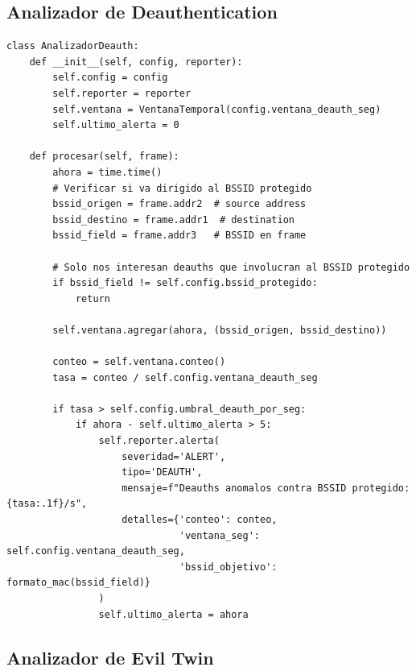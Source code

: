 \documentclass[11pt,a4paper]{article}
\begin{document}
\subsection{Analizador de Deauthentication}

\begin{lstlisting}
class AnalizadorDeauth:
    def __init__(self, config, reporter):
        self.config = config
        self.reporter = reporter
        self.ventana = VentanaTemporal(config.ventana_deauth_seg)
        self.ultimo_alerta = 0

    def procesar(self, frame):
        ahora = time.time()
        # Verificar si va dirigido al BSSID protegido
        bssid_origen = frame.addr2  # source address
        bssid_destino = frame.addr1  # destination
        bssid_field = frame.addr3   # BSSID en frame

        # Solo nos interesan deauths que involucran al BSSID protegido
        if bssid_field != self.config.bssid_protegido:
            return

        self.ventana.agregar(ahora, (bssid_origen, bssid_destino))

        conteo = self.ventana.conteo()
        tasa = conteo / self.config.ventana_deauth_seg

        if tasa > self.config.umbral_deauth_por_seg:
            if ahora - self.ultimo_alerta > 5:
                self.reporter.alerta(
                    severidad='ALERT',
                    tipo='DEAUTH',
                    mensaje=f"Deauths anomalos contra BSSID protegido: {tasa:.1f}/s",
                    detalles={'conteo': conteo,
                              'ventana_seg': self.config.ventana_deauth_seg,
                              'bssid_objetivo': formato_mac(bssid_field)}
                )
                self.ultimo_alerta = ahora
\end{lstlisting}

\subsection{Analizador de Evil Twin}
\end{document}
